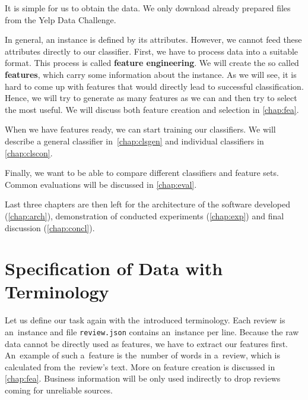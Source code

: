 It is simple for us to obtain the data. We only download already prepared files from the Yelp Data Challenge.

In general, an instance is defined by its attributes.
However, we cannot feed these attributes directly to our classifier.
First, we have to process data into a suitable format. This process is called {\bf feature engineering}.
We will create the so called {\bf features}, which carry some information about the instance.
As we will see, it is hard to come up with features that would directly lead to successful classification.
Hence, we will try to generate as many features as we can and then try to select the most useful.
We will discuss both feature creation and selection in \autoref{chap:fea}.

When we have features ready, we can start training our classifiers. We will describe a general classifier in~\ref{chap:clsgen} and
individual classifiers in \autoref{chap:clscon}.

Finally, we want to be able to compare different classifiers and feature sets. Common evaluations will be discussed in \ref{chap:eval}.

Last three chapters are then left for the architecture of the software developed (\autoref{chap:arch}), demonstration of conducted experiments (\autoref{chap:exp}) and final discussion (\autoref{chap:concl}).


\section{Specification of Data with Terminology}

Let us define our task again with the~introduced terminology.
Each review is an~instance and file \texttt{review.json} contains an~instance per line.
Because the raw data cannot be directly used as features, we have to extract our features first.
An~example of such a~feature is the~number of words in a~review, which is calculated from the~review's text.
More on feature creation is discussed in \autoref{chap:fea}.
Business information will be only used indirectly to drop reviews coming for unreliable sources.

